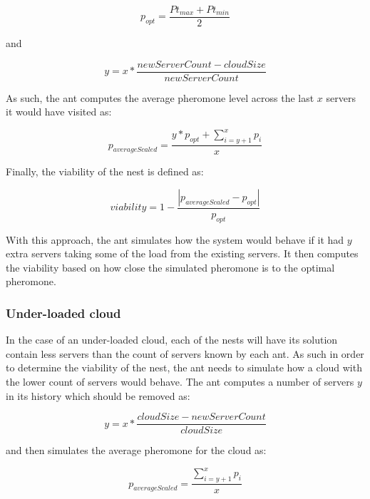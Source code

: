 \documentclass[conference]{IEEEtran}
\begin{document}
\begin{equation}
	p_{opt} = \frac{Pt_{max} + Pt_{min}}{2}
\end{equation}

and 

\begin{equation}
	y = x * \frac{newServerCount - cloudSize}{newServerCount}
\end{equation}

As such, the ant computes the average pheromone level across the last $x$ servers it would have visited as:

\begin{equation}
	p_{averageScaled} = \frac{y * p_{opt} + \sum\limits_{i=y+1}^x p_{i}}{x}
\end{equation}

Finally, the viability of the nest is defined as:

\begin{equation}
	viability = 1 - \frac{\left|p_{averageScaled} - p_{opt}\right|}{p_{opt}}
\end{equation}

With this approach, the ant simulates how the system would behave if it had $y$ extra servers taking some of the load from the existing servers. It then computes the viability based on how close the simulated pheromone is to the optimal pheromone.

\subsubsection{Under-loaded cloud}

In the case of an under-loaded cloud, each of the nests will have its solution contain less servers than the count of servers known by each ant. As such in order to determine the viability of the nest, the ant needs to simulate how a cloud with the lower count of servers would behave. The ant computes a number of servers $y$ in its history which should be removed as:

\begin{equation}
	y = x * \frac{cloudSize - newServerCount}{cloudSize}
\end{equation}

and then simulates the average pheromone for the cloud as:

\begin{equation}
	p_{averageScaled} = \frac{\sum\limits_{i=y+1}^x p_{i}}{x}
\end{equation}
\end{document}
